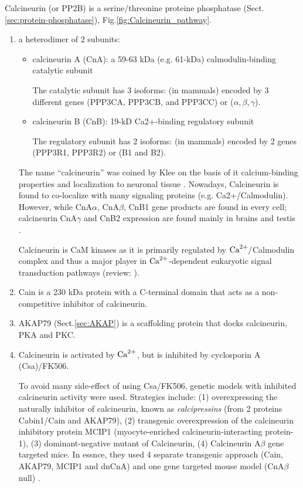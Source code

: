 Calcineurin (or PP2B) is a serine/threonine proteine phosphatase
(Sect.\ref{sec:protein-phosphatase}), Fig.\ref{fig:Calcineurin_pathway}.
\begin{enumerate}
  \item a heterodimer of 2 subunits:
  \begin{itemize}
    \item calcineurin A (CnA): a 59-63 kDa (e.g. 61-kDa) calmodulin-binding
    catalytic subunit

The catalytic subunit has 3 isoforms: (in mammals) encoded by 3 different genes
(PPP3CA, PPP3CB, and PPP3CC) or ($\alpha, \beta, \gamma$).
    
    \item calcineurin B (CnB): 19-kD Ca2+-binding regulatory subunit 

The regulatory subunit has 2 isoforms: (in mammals) encoded by 2 genes (PPP3R1,
PPP3R2) or (B1 and B2).
  \end{itemize}

The name ``calcineurin'' was coined by Klee on the basis of it calcium-binding
properties and localization to neuronal tissue \citep{klee1979}. Nowadays,
Calcineurin is found to co-localize with many signaling proteins (e.g.
Ca2+/Calmodulin).
However, while CnA$\alpha$, CnA$\beta$, CnB1 gene products are found in every
cell; calcineurin CnA$\gamma$ and CnB2 expression are found mainly in brains and
testis \citep{molkentin2004cns}.

Calcineurin is CaM kinases as it is primarily regulated by ${\text{Ca}^{2+}}/$Calmodulin
complex and thus a major player in ${\text{Ca}^{2+}}$-dependent eukaryotic signal
transduction pathways (review: \citep{rusnak2000}).

   \item Cain is a 230 kDa protein with a C-terminal domain that acts as a
non-competitive inhibitor of calcineurin.

   \item AKAP79 (Sect.\ref{sec:AKAP}) is a scaffolding protein that docks
   calcineurin, PKA and PKC.

  \item Calcineurin is activated by ${\text{Ca}^{2+}}$, but is inhibited by cyclosporin A
(Csa)/FK506. 

To avoid many side-effect of using Csa/FK506, genetic models with inhibited
calcineurin activity were used. Strategies include: (1) overexpressing
the naturally inhibitor of calcineurin, known as {\it calcipressins} (from 2
proteins Cabin1/Cain and AKAP79), (2) transgenic overexpression of the
calcineurin inhibitory protein MCIP1 (myocyte-enriched calcineurin-interacting
protein-1), (3) dominant-negative mutant of Calcineurin, (4) Calcineurin
A$\beta$ gene targeted mice. In essnce, they used 4 separate
transgenic approach (Cain, AKAP79, MCIP1 and dnCnA) and one gene
targeted mouse model (CnA$\beta$ null) \citep{wilkins2002cac}.

\end{enumerate}



